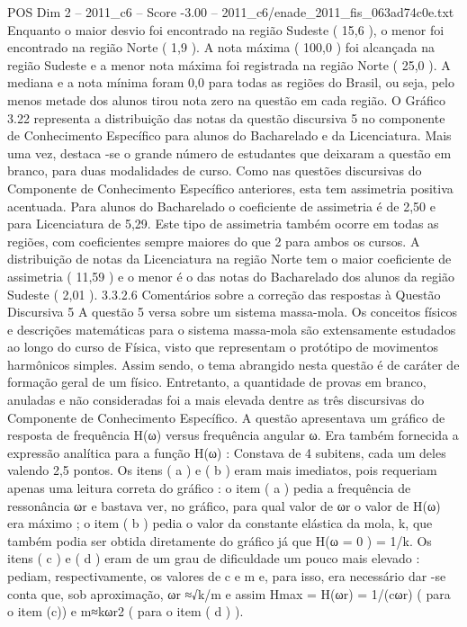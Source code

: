 \begin{textsample}{POS Dim 2 – 2011\_c6 – Score -3.00 – 2011\_c6/enade\_2011\_fis\_063ad74c0e.txt}
Enquanto o maior desvio foi encontrado na região Sudeste ( 15,6 ), o menor foi encontrado na região Norte ( 1,9 ).
A nota máxima ( 100,0 ) foi alcançada na região Sudeste e a menor nota máxima foi registrada na região Norte ( 25,0 ).
A mediana e a nota mínima foram 0,0 para todas as regiões do Brasil, ou seja, pelo menos metade dos alunos tirou nota zero na questão em cada região.
O Gráfico 3.22 representa a distribuição das notas da questão discursiva 5 no componente de Conhecimento Específico para alunos do Bacharelado e da Licenciatura.
Mais uma vez, destaca -se o grande número de estudantes que deixaram a questão em branco, para duas modalidades de curso.
Como nas questões discursivas do Componente de Conhecimento Específico anteriores, esta tem assimetria positiva acentuada.
Para alunos do Bacharelado o coeficiente de assimetria é de 2,50 e para Licenciatura de 5,29.
Este tipo de assimetria também ocorre em todas as regiões, com coeficientes sempre maiores do que 2 para ambos os cursos.
A distribuição de notas da Licenciatura na região Norte tem o maior coeficiente de assimetria ( 11,59 ) e o menor é o das notas do Bacharelado dos alunos da região Sudeste ( 2,01 ). 3.3.2.6 Comentários sobre a correção das respostas à Questão Discursiva 5 A questão 5 versa sobre um sistema massa-mola.
Os conceitos físicos e descrições matemáticas para o sistema massa-mola são extensamente estudados ao longo do curso de Física, visto que representam o protótipo de movimentos harmônicos simples.
Assim sendo, o tema abrangido nesta questão é de caráter de formação geral de um físico.
Entretanto, a quantidade de provas em branco, anuladas e não consideradas foi a mais elevada dentre as três discursivas do Componente de Conhecimento Específico.
A questão apresentava um gráfico de resposta de frequência H(ω) versus frequência angular ω.
Era também fornecida a expressão analítica para a função H(ω) : Constava de 4 subitens, cada um deles valendo 2,5 pontos.
Os itens ( a ) e ( b ) eram mais imediatos, pois requeriam apenas uma leitura correta do gráfico : o item ( a ) pedia a frequência de ressonância ωr e bastava ver, no gráfico, para qual valor de ωr o valor de H(ω) era máximo ; o item ( b ) pedia o valor da constante elástica da mola, k, que também podia ser obtida diretamente do gráfico já que H(ω = 0 ) = 1/k.
Os itens ( c ) e ( d ) eram de um grau de dificuldade um pouco mais elevado : pediam, respectivamente, os valores de c e m e, para isso, era necessário dar -se conta que, sob aproximação, ωr ≈√k/m e assim Hmax = H(ωr) = 1/(cωr) ( para o item (c)) e m≈kωr2 ( para o item ( d ) ).

\end{textsample}

